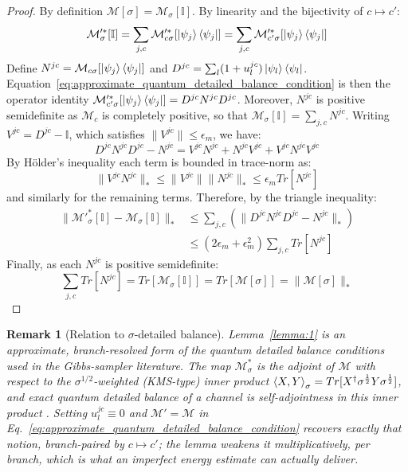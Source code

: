 \documentclass[aps,floatfix,10pt,amssymb,amsfont,amsmath,superscriptaddress,float,nofootinbib,longbibliography,nobalancelastpage,twocolumn]{revtex4-2}
\newtheorem{remark}{Remark}
\begin{document}
\begin{proof}
    By definition $\mathcal{M}[\sigma]=\mathcal{M}_{\sigma}[\mathbb{I}]$. By linearity and the bijectivity of $c \mapsto c'$:
    \begin{equation}
        \mathcal{M}'^*_{\sigma}[\mathbb{I}] = \sum_{j,c}\mathcal{M}'^*_{c\sigma}[\ket{\psi_j}\bra{\psi_j}] = \sum_{j,c}\mathcal{M}'^*_{c'\sigma}[\ket{\psi_j}\bra{\psi_j}]
    \end{equation}
    Define $N^{jc} = \mathcal{M}_{c\sigma}[\ket{\psi_j}\bra{\psi_j}]$ and $D^{jc}=\sum_l(1+u_l^{jc})\ket{\psi_l}\bra{\psi_l}$. Equation~\eqref{eq:approximate_quantum_detailed_balance_condition} is then the operator identity $\mathcal{M}'^*_{c'\sigma}[\ket{\psi_j}\bra{\psi_j}]=D^{jc}N^{jc}D^{jc}$. Moreover, $N^{jc}$ is positive semidefinite as $\mathcal{M}_c$ is completely positive, so that $\mathcal{M}_{\sigma}[\mathbb{I}] = \sum_{j,c}N^{jc}$. Writing $V^{jc} = D^{jc}-\mathbb{I}$, which satisfies $\|V^{jc}\|\leq\epsilon_m$, we have:
    \begin{equation}
        D^{jc}N^{jc}D^{jc} - N^{jc} = V^{jc}N^{jc} + N^{jc}V^{jc} + V^{jc}N^{jc}V^{jc}
    \end{equation}
    By H\"older's inequality each term is bounded in trace-norm as:
    \begin{equation}
        \|V^{jc}N^{jc}\|_* \leq \|V^{jc}\|\|N^{jc}\|_* \leq \epsilon_m Tr[N^{jc}]
    \end{equation}
    and similarly for the remaining terms. Therefore, by the triangle inequality:
    \begin{align}
        \|\mathcal{M}'^*_{\sigma}[\mathbb{I}]-\mathcal{M}_\sigma[\mathbb{I}]\|_* &\leq \sum_{j,c}\left(\|D^{jc}N^{jc}D^{jc}-N^{jc}\|_*\right)\\
        &\leq (2\epsilon_m+\epsilon_m^2)\sum_{j,c}Tr[N^{jc}] 
    \end{align}
    Finally, as each $N^{jc}$ is positive semidefinite:
    \begin{equation}
        \sum_{j,c}Tr[N^{jc}] = Tr[\mathcal{M}_{\sigma}[\mathbb{I}]] = Tr[\mathcal{M}[\sigma]] = \|\mathcal{M}[\sigma]\|_*
    \end{equation}
\end{proof}
\begin{remark}[Relation to $\sigma$-detailed balance]
Lemma~\ref{lemma:1} is an approximate, branch-resolved form of the quantum detailed balance conditions used in the Gibbs-sampler literature. The map $\mathcal{M}^*_{\sigma}$ is the adjoint of $\mathcal{M}$ with respect to the $\sigma^{1/2}$-weighted (KMS-type) inner product $\braket{X,Y}_{\sigma} = Tr[X^{\dagger}\sigma^{\frac{1}{2}}Y\sigma^{\frac{1}{2}}]$, and exact quantum detailed balance of a channel is self-adjointness in this inner product \cite{temme2010chi,chen2023quantumthermalstatepreparation}. Setting $u^{jc}_l \equiv 0$ and $\mathcal{M}' = \mathcal{M}$ in Eq.~\eqref{eq:approximate_quantum_detailed_balance_condition} recovers exactly that notion, branch-paired by $c \mapsto c'$; the lemma weakens it multiplicatively, per branch, which is what an imperfect energy estimate can actually deliver.
\end{remark}
\end{document}

